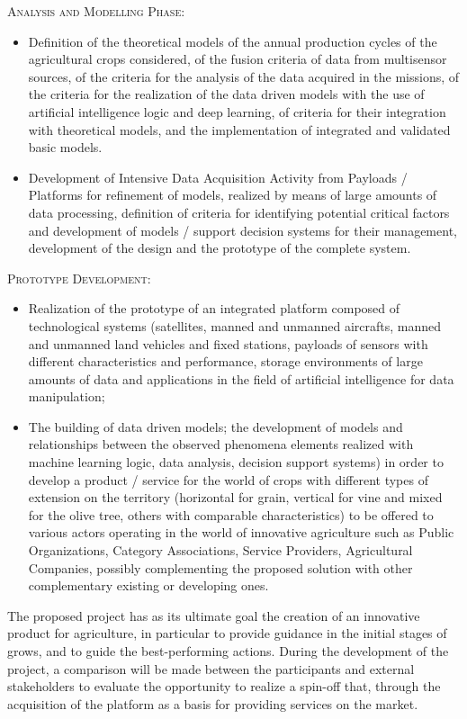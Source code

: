 \documentclass[comsoc,final]{IEEEtran}
\begin{document}
\textsc{Analysis and Modelling Phase:}

\begin{itemize}
\item Definition of the theoretical models of the annual production cycles of the agricultural crops considered, of the fusion criteria of data from multisensor sources, of the criteria for the analysis of the data acquired in the missions, of the criteria for the realization of the data driven models with the use of artificial intelligence logic and deep learning, of criteria for their integration with theoretical models, and the implementation of integrated and validated basic models.
\item Development of Intensive Data Acquisition Activity from Payloads / Platforms for refinement of models, realized by means of large amounts of data processing, definition of criteria for identifying potential critical factors and development of models / support decision systems for their management, development of the design and the prototype of the complete system.
\end{itemize}

\textsc{Prototype Development:}

\begin{itemize}
\item Realization of the prototype of an integrated platform composed of technological systems (satellites, manned and unmanned aircrafts, manned and unmanned land vehicles and fixed stations, payloads of sensors with different characteristics and performance, storage environments of large amounts of data and applications in the field of artificial intelligence for data manipulation;
\item The building of data driven models; the development of models and relationships between the observed phenomena elements realized with machine learning logic, data analysis, decision support systems) in order to develop a product / service for the world of crops with different types of extension on the territory (horizontal for grain, vertical for vine and mixed for the olive tree, others with comparable characteristics) to be offered to various actors operating in the world of innovative agriculture such as Public Organizations, Category Associations, Service Providers, Agricultural Companies, possibly complementing the proposed solution with other complementary existing or developing ones.
\end{itemize}

The proposed project has as its ultimate goal the creation of an innovative product for agriculture, in particular to provide guidance in the initial stages of grows, and to guide the best-performing actions. 
During the development of the project, a comparison will be made between the participants and external stakeholders to evaluate the opportunity to realize a spin-off that, through the acquisition of the platform as a basis for providing services on the market.
\end{document}

